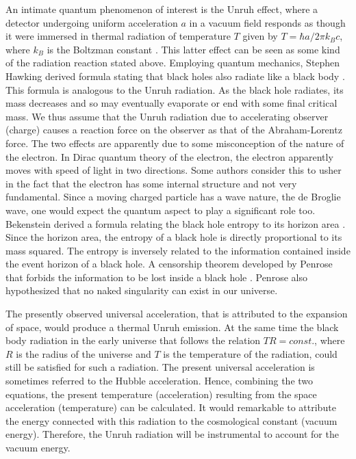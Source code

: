 \documentclass[a4]{epl2}
\begin{document}
An intimate quantum phenomenon of interest is the Unruh effect, where a detector undergoing uniform acceleration $a$ in a vacuum field responds as though it were
immersed in thermal radiation of temperature $T$ given by $T=\hbar a/2\pi k_Bc$, where $k_B$ is the Boltzman constant \textcolor[rgb]{0.00,0.07,1.00}{\cite{unruh}}. This latter effect can be seen as  some kind of the radiation reaction stated above.  Employing quantum mechanics,  Stephen Hawking derived formula stating that black holes also radiate like a black body \textcolor[rgb]{0.00,0.07,1.00}{\cite{hawking}}.  This formula is analogous to the Unruh radiation. As the black hole radiates, its mass decreases and so may eventually evaporate or end with some final critical mass. We thus assume that the Unruh radiation due to accelerating observer (charge) causes a reaction force on the observer as that of the Abraham-Lorentz force. The two effects are apparently due to some misconception of the nature of the electron.  In Dirac quantum theory of the electron, the electron apparently moves with speed of light in two directions. Some authors consider this to usher in the fact that the electron has some internal structure and not very fundamental. Since a moving charged particle has a wave nature, the de Broglie wave, one would expect the quantum aspect to play a significant role too. Bekenstein derived a formula relating the black hole entropy to its horizon area \textcolor[rgb]{0.00,0.07,1.00}{\cite{entropy}}. Since the horizon area, the entropy of a black hole is directly proportional to its mass squared. The entropy is  inversely related to the information contained inside the event horizon of a black hole. A censorship theorem developed by Penrose that forbids the information to be lost inside a black hole \textcolor[rgb]{0.00,0.07,1.00}{\cite{censor}}. Penrose also hypothesized that no naked singularity can exist in our universe.

The presently observed  universal acceleration, that is attributed to  the expansion of space, would produce a thermal Unruh emission. At the same time the black body radiation in the early universe that follows the relation $TR=const.$, where $R$ is the radius of the universe and $T$ is the temperature of the radiation, could still be satisfied for such a radiation. The present universal acceleration is sometimes referred to the Hubble acceleration. Hence, combining the two equations, the present temperature (acceleration)  resulting from the space acceleration (temperature) can be calculated. It would remarkable to attribute the energy connected with this radiation to the cosmological constant (vacuum energy). Therefore, the Unruh radiation will be instrumental to account for the vacuum energy.
\end{document}
